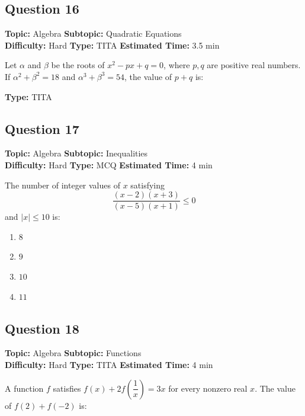\documentclass[11pt]{article}
\begin{document}
\subsection*{Question 16}
\textbf{Topic:} Algebra \quad \textbf{Subtopic:} Quadratic Equations \\
\textbf{Difficulty:} Hard \quad \textbf{Type:} TITA \quad \textbf{Estimated Time:} 3.5 min

\begin{tcolorbox}
Let \(\alpha\) and \(\beta\) be the roots of \(x^2 - px + q = 0\), where \(p, q\) are positive real numbers. If \(\alpha^2 + \beta^2 = 18\) and \(\alpha^3 + \beta^3 = 54\), the value of \(p + q\) is:
\end{tcolorbox}

\textbf{Type:} TITA

\subsection*{Question 17}
\textbf{Topic:} Algebra \quad \textbf{Subtopic:} Inequalities \\
\textbf{Difficulty:} Hard \quad \textbf{Type:} MCQ \quad \textbf{Estimated Time:} 4 min

\begin{tcolorbox}
The number of integer values of \(x\) satisfying
\[
\frac{(x-2)(x+3)}{(x-5)(x+1)} \le 0
\]
and \(|x| \le 10\) is:
\end{tcolorbox}

\begin{enumerate}[label=(\Alph*)]
    \item \(8\)
    \item \(9\)
    \item \(10\)
    \item \(11\)
\end{enumerate}

\subsection*{Question 18}
\textbf{Topic:} Algebra \quad \textbf{Subtopic:} Functions \\
\textbf{Difficulty:} Hard \quad \textbf{Type:} TITA \quad \textbf{Estimated Time:} 4 min

\begin{tcolorbox}
A function \(f\) satisfies \(f(x) + 2 f\!\left(\dfrac{1}{x}\right) = 3x\) for every nonzero real \(x\). The value of \(f(2) + f(-2)\) is:
\end{tcolorbox}
\end{document}
